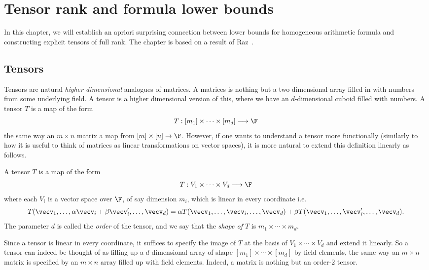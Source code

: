 \chapter{Tensor rank and formula lower bounds}\label{chap:tensorrk}

In this chapter, we will establish an apriori surprising connection between lower bounds for homogeneous arithmetic formula and constructing explicit tensors of full rank.
The chapter is based on a result of Raz~\cite{raz10}.

\section{Tensors}

Tensors are natural \emph{higher dimensional} analogues of matrices.
A matrices is nothing but a two dimensional array filled in with numbers from some underlying field.
A tensor is a higher dimensional version of this, where we have an $d$-dimensional cuboid filled with numbers.
A tensor $T$ is a map of the form
\[
T: [m_1] \times \cdots \times [m_d] \longrightarrow \F
\]
the same way an $m\times n$ matrix a map from $[m] \times [n] \rightarrow \F$.
However, if one wants to understand a tensor more functionally (similarly to how it is useful to think of matrices as linear transformations on vector spaces), it is more natural to extend this definition linearly as follows.

\begin{definition}[Tensor]\label{defn:tensor}
A tensor $T$ is a map of the form 
\[
T: V_1 \times \cdots \times V_d \longrightarrow \F
\]
where each $V_i$ is a vector space over $\F$, of say dimension $m_i$, which is linear in every coordinate i.e.
\[
T(\vecv_1, \ldots,\alpha\vecv_i + \beta\vecv_i', \ldots, \vecv_d) = \alpha T(\vecv_1, \ldots,\vecv_i, \ldots, \vecv_d) + \beta T(\vecv_1, \ldots,\vecv_i', \ldots, \vecv_d).
\]
The parameter $d$ is called the \emph{order} of the tensor, and we say that the \emph{shape of $T$} is $m_1 \times \cdots \times m_d$. 
\end{definition}
Since a tensor is linear in every coordinate, it suffices to specify the image of $T$ at the basis of $V_1 \times \cdots \times V_d$ and extend it linearly.
So a tensor can indeed be thought of as filling up a $d$-dimensional array of shape $[m_1]\times \cdots \times [m_d]$ by field elements, the same way an $m\times n$ matrix is specified by an $m\times n$ array filled up with field elements.
Indeed, a matrix is nothing but an order-$2$ tensor.


